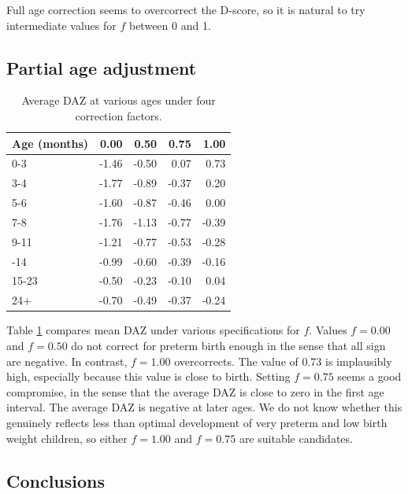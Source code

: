 \documentclass[
]{book}
\begin{document}
Full age correction seems to overcorrect the D-score, so it is natural to try intermediate values for \(f\) between 0 and 1.

\hypertarget{partial-age-adjustment}{%
\subsection{Partial age adjustment}\label{partial-age-adjustment}}

\begin{table}

\caption{\label{tab:tabz}Average DAZ at various ages under four correction factors.}
\centering
\begin{tabular}[t]{lrrrr}
\toprule
Age (months) & 0.00 & 0.50 & 0.75 & 1.00\\
\midrule
0-3 & -1.46 & -0.50 & 0.07 & 0.73\\
3-4 & -1.77 & -0.89 & -0.37 & 0.20\\
5-6 & -1.60 & -0.87 & -0.46 & 0.00\\
7-8 & -1.76 & -1.13 & -0.77 & -0.39\\
9-11 & -1.21 & -0.77 & -0.53 & -0.28\\
\addlinespace
12-14 & -0.99 & -0.60 & -0.39 & -0.16\\
15-23 & -0.50 & -0.23 & -0.10 & 0.04\\
24+ & -0.70 & -0.49 & -0.37 & -0.24\\
\bottomrule
\end{tabular}
\end{table}

Table \ref{tab:tabz} compares mean DAZ under various specifications for \(f\). Values \(f = 0.00\) and \(f = 0.50\) do not correct for preterm birth enough in the sense that all sign are negative. In contrast, \(f = 1.00\) overcorrects. The value of 0.73 is implausibly high, especially because this value is close to birth. Setting \(f = 0.75\) seems a good compromise, in the sense that the average DAZ is close to zero in the first age interval. The average DAZ is negative at later ages. We do not know whether this genuinely reflects less than optimal development of very preterm and low birth weight children, so either \(f = 1.00\) and \(f = 0.75\) are suitable candidates.

\hypertarget{conclusions}{%
\subsection{Conclusions}\label{conclusions}}
\end{document}
